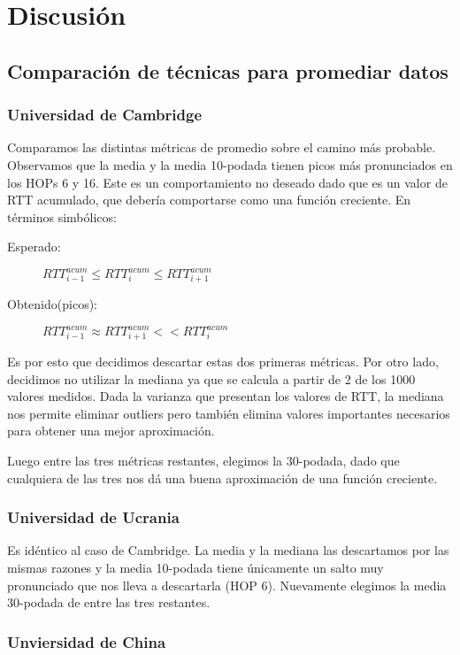 \section{Discusión}

\subsection{Comparación de técnicas para promediar datos} \label{discusion:comparacionDeMetricas}

\subsubsection{Universidad de Cambridge}
Comparamos las distintas métricas de promedio sobre el camino más probable. Observamos que la media y la media 10-podada tienen picos más pronunciados en los HOPs 6 y 16.
Este es un comportamiento no deseado dado que es un valor de RTT acumulado, que debería comportarse como una función creciente. En términos simbólicos:
\begin{description}
 \item[Esperado:] $RTT^{acum}_{i-1} \leq RTT^{acum}_{i} \leq RTT^{acum}_{i+1}$
 \item[Obtenido(picos):] $RTT^{acum}_{i-1} \approx RTT^{acum}_{i+1} << RTT^{acum}_{i}$
\end{description}

Es por esto que decidimos descartar estas dos primeras métricas. Por otro lado, decidimos no utilizar la mediana ya que se calcula a partir de 2 de los 1000 valores medidos.
Dada la varianza que presentan los valores de RTT, la mediana nos permite eliminar outliers pero también elimina valores importantes necesarios para obtener una mejor aproximación.

Luego entre las tres métricas restantes, elegimos la 30-podada, dado que cualquiera de las tres nos dá una buena aproximación de una función creciente. 

\subsubsection{Universidad de Ucrania}

Es idéntico al caso de Cambridge. La media y la mediana las descartamos por las mismas razones y la media 10-podada tiene únicamente un salto muy pronunciado que nos
lleva a descartarla (HOP 6). Nuevamente elegimos la media 30-podada de entre las tres restantes.

\subsubsection{Unviersidad de China}

